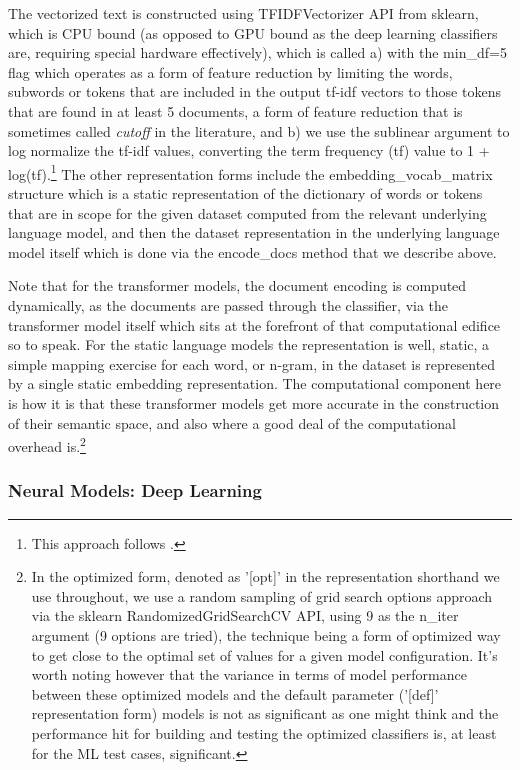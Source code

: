 \documentclass[final]{clv2025}
\begin{document}
The vectorized text is constructed using TFIDFVectorizer API from sklearn, which is CPU bound (as opposed to GPU bound as the deep learning classifiers are, requiring special hardware effectively), which is called a) with the min\_df=5 flag which operates as a form of feature reduction by limiting the words, subwords or tokens that are included in the output tf-idf vectors to those tokens that are found in at least 5 documents, a form of feature reduction that is sometimes called \textit{cutoff} in the literature, and b) we use the sublinear argument to log normalize the tf-idf values, converting the term frequency (tf) value to 1 + log(tf).\footnote{This approach follows \cite{moreo2021}.} The other representation forms include the embedding\_vocab\_matrix structure which is a static representation of the dictionary of words or tokens that are in scope for the given dataset computed from the relevant underlying language model, and then the dataset representation in the underlying language model itself which is done via the encode\_docs method that we describe above. 

Note that for the transformer models, the document encoding is computed dynamically, as the documents are passed through the classifier, via the transformer model itself which sits at the forefront of that computational edifice so to speak. For the static language models the representation is well, static, a simple mapping exercise for each word, or n-gram, in the dataset is represented by a single static embedding representation. The computational component here is how it is that these transformer models get more accurate in the construction of their semantic space, and also where a good deal of the computational overhead is.\footnote{In the optimized form, denoted as '[opt]' in the representation shorthand we use throughout, we use a random sampling of grid search options approach via the sklearn RandomizedGridSearchCV API, using 9 as the n\_iter argument (9 options are tried), the technique being a form of optimized way to get close to the optimal set of values for a given model configuration. It's worth noting however that the variance in terms of model performance between these optimized models and the default parameter ('[def]' representation form) models is not as significant as one might think and the performance hit for building and testing the optimized classifiers is, at least for the ML test cases, significant.} 


\subsubsection{Neural Models: Deep Learning}
\end{document}
